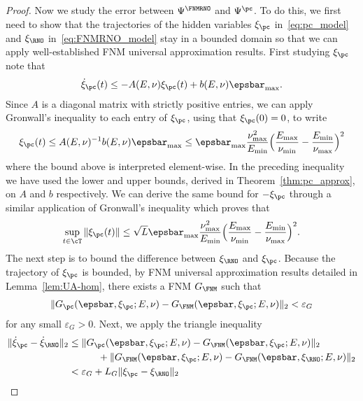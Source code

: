 \documentclass[letterpaper,11pt]{article}
\begin{document}
\begin{proof}
    Now we study the error between $\Psi^{\FNMRNO}$ and $\Psi^{\pc}$. To do this, we first need to show that the trajectories of the hidden variables $\xi_{\pc}$ in~\eqref{eq:pc_model} and $\xi_{\RNO}$ in~\eqref{eq:FNMRNO_model} stay in a bounded domain so that we can apply well-established FNM universal approximation results. First studying $\xi_{\pc}$ note that
    \begin{align*}
        \dot{\xi}_{\pc}(t) \leq - A(E, \nu)\xi_{\pc}(t) + b(E, \nu)\epsbar_{\max}.
    \end{align*}
    Since $A$ is a diagonal matrix with strictly positive entries, we can apply Gronwall's inequality to each entry of $\xi_{\pc}$, using that $\xi_{\pc}(0)=0$, to write
    \begin{align*}
        \xi_{\pc}(t) \leq A(E, \nu)^{-1}b(E, \nu)\epsbar_{\max} \leq \epsbar_{\max}\frac{\nu_{\max}^2}{E_{\min}}\Big(\frac{E_{\max}}{\nu_{\min}} - \frac{E_{\min}}{\nu_{\max}}\Big)^2
    \end{align*}
    where the bound above is interpreted element-wise. In the preceding inequality we have used the lower and upper bounds, derived in Theorem~\ref{thm:pc_approx}, on $A$ and $b$ respectively. We can derive the same bound for $-\xi_{\pc}$ through a similar application of Gronwall's inequality which proves that
    \begin{equation}\label{eq:xi_pc_bound}
        \sup_{t \in \cT}\|\xi_{\pc}(t)\| \leq \sqrt{L}\epsbar_{\max}\frac{\nu_{\max}^2}{E_{\min}}\Big(\frac{E_{\max}}{\nu_{\min}} - \frac{E_{\min}}{\nu_{\max}}\Big)^2.
    \end{equation}
    The next step is to bound the difference between $\xi_{\RNO}$ and $\xi_{\pc}$. Because the trajectory of $\xi_{\pc}$ is bounded, by FNM universal approximation results detailed in Lemma~\ref{lem:UA-hom}, there exists a FNM $G_{\FNM}$ such that
    \begin{align*}
        \|G_{\pc}(\epsbar, \xi_{\pc}; E, \nu) - G_{\FNM}(\epsbar, \xi_{\pc}; E, \nu)\|_2 < \varepsilon_G
    \end{align*}
    for any small $\varepsilon_G > 0$. 
    Next, we apply the triangle inequality
    \begin{align*}
        \|\dot{\xi}_{\pc} - \dot{\xi}_{\RNO}\|_2 &\leq \|G_{\pc}(\epsbar, \xi_{\pc}; E, \nu) - G_{\FNM}(\epsbar, \xi_{\pc}; E, \nu)\|_2\\
        &\quad\quad\quad +  \|G_{\FNM}(\epsbar, \xi_{\pc}; E, \nu)-G_{\FNM}(\epsbar, \xi_{\RNO}; E, \nu)\|_2\\
        &< \varepsilon_{G} + L_G\|\xi_{\pc} - \xi_{\RNO}\|_2

\end{align*}
\end{proof}
\end{document}
